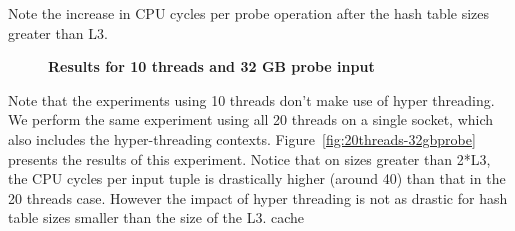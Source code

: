 Note the increase in CPU cycles per probe operation after the hash table sizes greater than L3. 

\begin{figure}[t]
	\centering
		\vspace{-0.6em}
	\caption{\textbf{Results for 10 threads and 32 GB probe input}}
	\label{fig:10threads-32gbprobe}
		\vspace{-1em}
\end{figure}

Note that the experiments using 10 threads don't make use of hyper threading. 
We perform the same experiment using all 20 threads on a single socket, which also includes the hyper-threading contexts. 
Figure~\ref{fig:20threads-32gbprobe} presents the results of this experiment. 
Notice that on sizes greater than 2*L3, the CPU cycles per input tuple is drastically higher (around 40) than that in the 20 threads case. 
However the impact of hyper threading is not as drastic for hash table sizes smaller than the size of the L3. cache 

